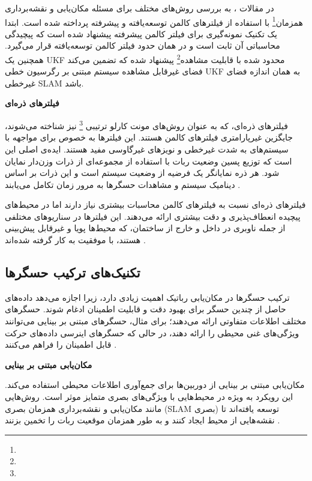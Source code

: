  
در مقالات 
\cite{huang2013quadratic, kim2008unscented, cheng2014compressed}
، به بررسی روش‌های مختلف برای مسئله مکان‌یابی و نقشه‌برداری همزمان\footnote{}
 با استفاده از فیلترهای کالمن توسعه‌یافته و پیشرفته پرداخته شده است. ابتدا یک تکنیک نمونه‌گیری برای فیلتر کالمن پیشرفته پیشنهاد شده است که پیچیدگی محاسباتی آن ثابت است و در همان حدود فیلتر کالمن توسعه‌یافته قرار می‌گیرد. همچنین یک UKF محدود شده با قابلیت مشاهده\footnote{} پیشنهاد شده که تضمین می‌کند فضای غیرقابل مشاهده سیستم مبتنی بر رگرسیون خطی UKF به همان اندازه فضای غیرخطی SLAM باشد.
 

\textbf {فیلترهای ذره‌ای}

فیلترهای ذره‌ای، که به عنوان روش‌های مونت کارلو ترتیبی
\footnote{}
 نیز شناخته می‌شوند، جایگزین غیرپارامتری فیلترهای کالمن هستند. این فیلترها به خصوص برای مواجهه با سیستم‌های به شدت غیرخطی و نویزهای غیرگاوسی مفید هستند. ایده‌ی اصلی این است که توزیع پسین وضعیت ربات با استفاده از مجموعه‌ای از ذرات وزن‌دار نمایان شود. هر ذره نمایانگر یک فرضیه از وضعیت سیستم است و این ذرات بر اساس دینامیک سیستم و مشاهدات حسگرها به مرور زمان تکامل می‌یابند
\cite{fox2001particle}.

فیلترهای ذره‌ای نسبت به فیلترهای کالمن محاسبات بیشتری نیاز دارند اما در محیط‌های پیچیده انعطاف‌پذیری و دقت بیشتری ارائه می‌دهند. این فیلترها در سناریوهای مختلفی از جمله ناوبری در داخل و خارج از ساختمان، که محیط‌ها پویا و غیرقابل پیش‌بینی هستند، با موفقیت به کار گرفته شده‌اند
 \cite{fox2001particle, montemerlo2002conditional, kwok2003adaptive}.

\subsection{تکنیک‌های ترکیب حسگرها}

ترکیب حسگرها در مکان‌یابی رباتیک اهمیت زیادی دارد، زیرا اجازه می‌دهد داده‌های حاصل از چندین حسگر برای بهبود دقت و قابلیت اطمینان ادغام شوند. حسگرهای مختلف اطلاعات متفاوتی ارائه می‌دهند؛ برای مثال، حسگرهای مبتنی بر بینایی می‌توانند ویژگی‌های غنی محیطی را ارائه دهند، در حالی که حسگرهای اینرسی داده‌های حرکت قابل اطمینان را فراهم می‌کنند
\cite{srinivasan2007multiple}.

\textbf{مکان‌یابی مبتنی بر بینایی}

مکان‌یابی مبتنی بر بینایی از دوربین‌ها برای جمع‌آوری اطلاعات محیطی استفاده می‌کند. این رویکرد به ویژه در محیط‌هایی با ویژگی‌های بصری متمایز موثر است. روش‌هایی مانند مکان‌یابی و نقشه‌برداری همزمان بصری (SLAM بصری) توسعه یافته‌اند تا نقشه‌هایی از محیط ایجاد کنند و به طور همزمان موقعیت ربات را تخمین بزنند
 \cite{westman2018underwater, hiebert2022introduction}.

